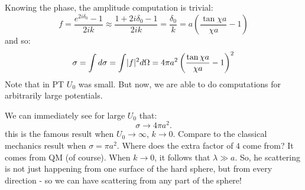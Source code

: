 Knowing the phase, the amplitude computation is trivial:
\begin{equation}
    f = \frac{e^{2i\delta_0} - 1}{2ik} \approx \frac{1 + 2i\delta_0 - 1}{2ik} = \frac{\delta_0}{k} = a\left(\frac{\tan \chi a}{\chi a} - 1\right)
\end{equation}
and so:
\begin{equation}
    \sigma = \int d\sigma = \int \lvert f \rvert^2 d\Omega = 4\pi a^2 \left(\frac{\tan \chi a}{\chi a} - 1\right)^2
\end{equation}
Note that in PT $U_0$ was small. But now, we are able to do computations for arbitrarily large potentials.

We can immediately see for large $U_0$ that:
\begin{equation}
    \sigma \to 4\pi a^2.
\end{equation}
this is the famous result when $U_0 \to \infty$, $k \to 0$. Compare to the classical mechanics result when $\sigma = \pi a^2$. Where does the extra factor of $4$ come from? It comes from QM (of course). When $k \to 0$, it follows that $\lambda \gg a$. So, he scattering is not just happening from one surface of the hard sphere, but from every direction - so we can have scattering from any part of the sphere!

